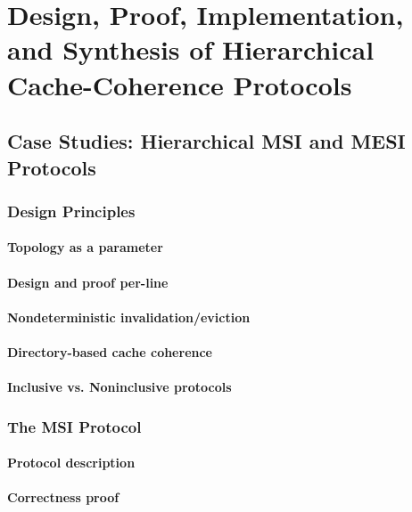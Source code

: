 \part{Design, Proof, Implementation, and Synthesis of Hierarchical Cache-Coherence Protocols}

\chapter{Case Studies: Hierarchical MSI and MESI Protocols}

\section{Design Principles}

\subsection{Topology as a parameter}

\subsection{Design and proof per-line}

\subsection{Nondeterministic invalidation/eviction}

\subsection{Directory-based cache coherence}

\subsection{Inclusive vs. Noninclusive protocols}

\section{The MSI Protocol}
\label{sec-msi-protocol}

\subsection{Protocol description}

\subsection{Correctness proof}
\label{sec-msi-proof}

